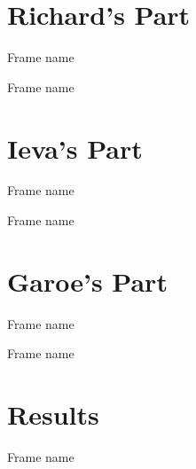 \documentclass{beamer}
\begin{document}
\section{Richard's Part}
\begin{frame}{Frame name}

\end{frame}

\begin{frame}{Frame name}

\end{frame}

\section{Ieva's Part}
\begin{frame}{Frame name}

\end{frame}


\begin{frame}{Frame name}

\end{frame}


\section{Garoe's Part}
\begin{frame}{Frame name}

\end{frame}


\begin{frame}{Frame name}

\end{frame}


\section{Results}
\begin{frame}{Frame name}
\end{frame}
\end{document}
